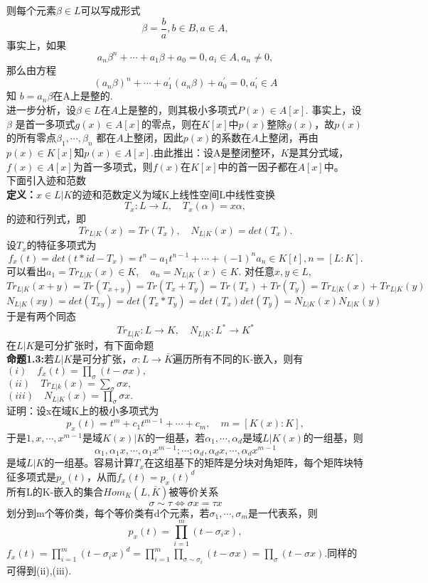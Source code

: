 \documentclass[UTF8]{article}
\begin{document}
	则每个元素$\beta \in L$可以写成形式$$\beta=\frac{b}{a},b \in B ,a\in A,$$
	事实上，如果$$a_n\beta^n+\cdots +a_1\beta +a_0=0,a_i\in A,a_n\neq 0,$$
	那么由方程$$(a_n\beta)^n+\cdots+a_1^{'}(a_n\beta)+a_0^{'}=0,a_i^{'}\in A$$知 $b=a_n\beta$在A上是整的.\\
	进一步分析，设$\beta \in L$在$A$上是整的，则其极小多项式$P(x)\in A[x].$ 事实上，设$\beta$ 是首一多项式$g(x)\in A[x]$的零点，则在$K[x]$中$p(x)$整除$g(x)$，故$p(x)$的所有零点$\beta_{1},\cdots ,\beta_{n}$
	都在$A$上整闭，因此$p(x)$的系数在$A$上整闭，再由$p(x)\in K[x]$知$p(x) \in A[x]$.由此推出：设A是整闭整环，$K$是其分式域，$f(x)\in A[x]$为首一多项式，则$f(x)$在$K[x]$中的首一因子都在$A[x]$中。\\
	下面引入迹和范数\\
	\textbf{定义：}$x \in L|K$的迹和范数定义为域K上线性空间L中线性变换
	$$T_{x}:L \rightarrow L,\quad T_{x}(\alpha)=x\alpha,$$
	的迹和行列式，即$$Tr_{L|K}(x)=Tr(T_x),\quad N_{L|K}(x)=det(T_x).$$
	设$T_x$的特征多项式为$$
	f_x(t)=det(t*id-T_x)=t^n-a_1 t^{n-1}+\cdots+(-1)^n a_n \in K[t],n=[L:K].$$
	可以看出$a_1=Tr_{L|K}(x)\in K,\quad a_n=N_{L|K}(x)\in K.$
	对任意$x,y \in L$,$$
	Tr_{L|K}(x+y)=Tr(T_{x+y})=Tr(T_x+T_y)=Tr(T_x)+Tr(T_y)=Tr_{L|K}(x)+Tr_{L|K}(y)$$ $$
	N_{L|K}(xy)=det(T_{xy})=det(T_x*T_y)=det(T_x)det(T_y)=N_{L|K}(x)N_{L|K}(y)$$于是有两个同态$$
	Tr_{L|K}:L \rightarrow K ,\quad N_{L|K}:L^{*}\rightarrow K^{*}$$
	在$L|K$是可分扩张时，有下面命题\\
	\textbf{命题1.3:}若$L|K$是可分扩张，$\sigma :L\rightarrow \bar{K}$遍历所有不同的K-嵌入，则有\\
	$(i)\quad f_x(t)=\prod_{\sigma}(t-\sigma x),$\\
	$(ii)\quad Tr_{L|k}(x)=\sum_{\sigma}\sigma x,$\\
	$(iii)\quad N_{L|K}(x)=\prod_{\sigma}\sigma x.$\\
	证明：设x在域K上的极小多项式为
	$$p_{x}(t)=t^m+c_{1}t^{m-1}+\cdots +c_m,\quad m=[K(x):K],$$
	于是$1,x,\cdots,x^{m-1}$是域$K(x)|K$的一组基，若$\alpha_{1},\cdots,\alpha_{d}$是域$L|K(x)$的一组基，则$$
	\alpha_{1},\alpha_{1}x,\cdots ,\alpha_{1}x^{m-1};\cdots;
	\alpha_{d},\alpha_{d}x,\cdots,\alpha_{d}x^{m-1}$$
	是域$L|K$的一组基。容易计算$T_x$在这组基下的矩阵是分块对角矩阵，每个矩阵块特征多项式是$p_{x}(t)$，从而$f_{x}(t)=p_{x}(t)^d$\\
	所有L的K-嵌入的集合$Hom_{K}(L,\bar{K})$被等价关系$$\sigma \sim \tau \Longleftrightarrow \sigma x=\tau x
	$$划分到m个等价类，每个等价类有d个元素，若$\sigma_1,\cdots,\sigma_{m}$是一代表系，则$$p_{x}(t)=\prod_{i=1}^{m}(t-\sigma_{i}x),$$
	$f_{x}(t)=\prod_{i=1}^{m}(t-\sigma_{i}x)^{d}=\prod_{i=1}^{m}\prod_{\sigma \sim \sigma_{i}}(t-\sigma x)=\prod_{\sigma}(t-\sigma x).$同样的可得到(ii),(iii).\\
\end{document}
